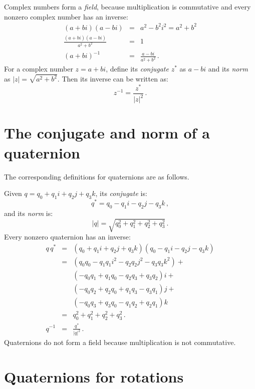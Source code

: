 \documentclass[11pt,a4paper]{report}
\begin{document}
Complex numbers form a \emph{field}, because multiplication is commutative and every nonzero complex number has an inverse:
\begin{eqnarray*}
(a+bi)(a-bi) &=& a^2 - b^2i^2 = a^2+b^2\\
\frac{(a+bi)(a-bi)}{a^2+b^2} &=& 1\\
(a+bi)^{-1} &=& \frac{a-bi}{a^2+b^2}\,.
\end{eqnarray*}
For a complex number $z=a+bi$, define its \emph{conjugate} $z^*$ as $a-bi$ and its \emph{norm} as $|z|=\sqrt{a^2+b^2}$. Then its inverse can be written as:
\begin{displaymath}
z^{-1}=\frac{z^*}{|z|^2}\,.
\end{displaymath}

\section{The conjugate and norm of a quaternion}

The corresponding definitions for quaternions are as follows.

Given $q=q_0+q_1i+q_2j+q_3k$, its \emph{conjugate} is:
\begin{displaymath}
q^*=q_0-q_1i-q_2j-q_3k\,,
\end{displaymath}
and its \emph{norm} is:
\begin{displaymath}
|q|=\sqrt{q_0^2+q_1^2+q_2^2+q_3^2}\,.
\end{displaymath}
Every nonzero quaternion has an inverse:
\begin{eqnarray*}
q\,q^* &=& (q_0+q_1i+q_2j+q_3k)(q_0-q_1i-q_2j-q_3k)\\
&=& (q_0q_0 - q_1q_1i^2 - q_2q_2j^2 - q_3q_3k^2) +\\
&& (-q_0q_1 + q_1q_0 - q_2q_3 + q_3q_2)i +\\
&& (-q_0q_2 + q_2q_0 + q_1q_3 - q_3q_1)j +\\
&& (-q_0q_3 + q_3q_0 - q_1q_2 + q_2q_1)k\\
&=&  q_0^2 + q_1^2 + q_2^2 + q_3^2\,.\\
q^{-1}&=&\frac{q^*}{|q|^2}\,.
\end{eqnarray*}
Quaternions do not form a field because multiplication is not commutative.


\section{Quaternions for rotations}
\end{document}
